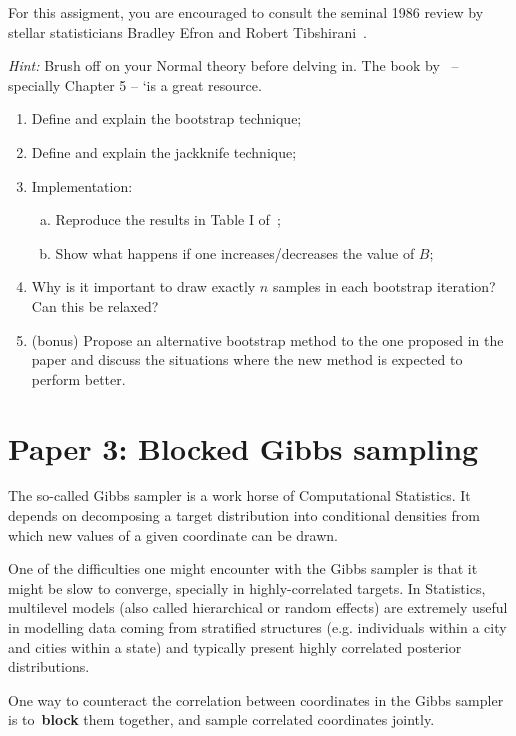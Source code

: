 \documentclass[a4paper,10pt, notitlepage]{report}
\begin{document}
For this assigment, you are encouraged to consult the seminal 1986 review by stellar statisticians Bradley Efron and Robert Tibshirani~\citep{Efron1986}.

\textit{Hint:} Brush off on your Normal theory before delving in.
The book by~\cite{Schervish2012} -- specially Chapter 5 -- `is a great resource.

\begin{enumerate}
 \item Define and explain the bootstrap technique;
 \item Define and explain the jackknife technique;
 \item Implementation:
\begin{enumerate}[(a)]
   \item Reproduce the results in Table I of~\cite{Efron1986};
   \item Show what happens if one increases/decreases the value of $B$;
 \end{enumerate} 
 \item Why is it important to draw exactly $n$ samples in each bootstrap iteration? Can this be relaxed?
 \item (bonus) Propose an alternative bootstrap method to the one proposed in the paper and discuss the situations where the new method is expected to perform better.
\end{enumerate}

\section*{Paper 3: Blocked Gibbs sampling~\citep{Tan2009}}

The so-called Gibbs sampler is a work horse of Computational Statistics.
It depends on decomposing a target distribution into conditional densities from which new values of a given coordinate can be drawn.

One of the difficulties one might encounter with the Gibbs sampler is that it might be slow to converge, specially in highly-correlated targets.
In Statistics, multilevel models (also called hierarchical or random effects) are extremely useful in modelling data coming from stratified structures (e.g. individuals within a city and cities within a state) and typically present highly correlated posterior distributions.

One way to counteract the correlation between coordinates in the Gibbs sampler is to~\textbf{block} them together, and sample correlated coordinates jointly.
\end{document}
